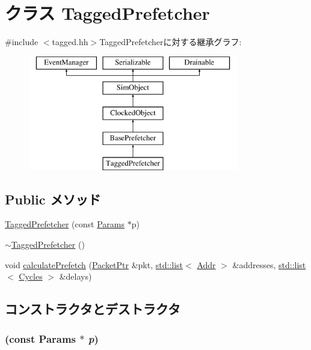 \hypertarget{classTaggedPrefetcher}{
\section{クラス TaggedPrefetcher}
\label{classTaggedPrefetcher}
}


{\ttfamily \#include $<$tagged.hh$>$}TaggedPrefetcherに対する継承グラフ:\begin{figure}[H]
\begin{center}
\leavevmode
\includegraphics[height=5cm]{classTaggedPrefetcher}
\end{center}
\end{figure}
\subsection*{Public メソッド}
\begin{DoxyCompactItemize}
\item 
\hyperlink{classTaggedPrefetcher_a42e2570480b8cca2b7891523c5569356}{TaggedPrefetcher} (const \hyperlink{classBasePrefetcher_a46661f02a5642b04fd4e12f645ad9c5c}{Params} $\ast$p)
\item 
\hyperlink{classTaggedPrefetcher_a37395794c36761f7764744f2cb6c388b}{$\sim$TaggedPrefetcher} ()
\item 
void \hyperlink{classTaggedPrefetcher_a1cc3d838a8314074cfda794f18eb6de9}{calculatePrefetch} (\hyperlink{classPacket}{PacketPtr} \&pkt, \hyperlink{classstd_1_1list}{std::list}$<$ \hyperlink{base_2types_8hh_af1bb03d6a4ee096394a6749f0a169232}{Addr} $>$ \&addresses, \hyperlink{classstd_1_1list}{std::list}$<$ \hyperlink{classCycles}{Cycles} $>$ \&delays)
\end{DoxyCompactItemize}


\subsection{コンストラクタとデストラクタ}
\hypertarget{classTaggedPrefetcher_a42e2570480b8cca2b7891523c5569356}{
\subsubsection[{TaggedPrefetcher}]{ (const {\bf Params} $\ast$ {\em p})}}
\label{classTaggedPrefetcher_a42e2570480b8cca2b7891523c5569356}



